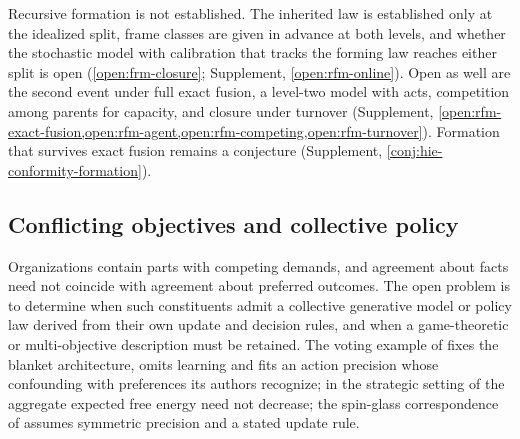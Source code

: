 Recursive formation is not established. The inherited law is established only at the idealized split, frame classes are given in advance at both levels, and whether the stochastic model with calibration that tracks the forming law reaches either split is open (\cref{open:frm-closure}; Supplement, \cref{open:rfm-online}). Open as well are the second event under full exact fusion, a level-two model with acts, competition among parents for capacity, and closure under turnover (Supplement, \cref{open:rfm-exact-fusion,open:rfm-agent,open:rfm-competing,open:rfm-turnover}). Formation that survives exact fusion remains a conjecture (Supplement, \cref{conj:hie-conformity-formation}).

\subsection{Conflicting objectives and collective policy}\label{sec:opn-4}

Organizations contain parts with competing demands, and agreement about facts need not coincide with agreement about preferred outcomes. The open problem is to determine when such constituents admit a collective generative model or policy law derived from their own update and decision rules, and when a game-theoretic or multi-objective description must be retained. The voting example of \citet{waade2025one} fixes the blanket architecture, omits learning and fits an action precision whose confounding with preferences its authors recognize; in the strategic setting of \citet{ruizserra2025factorised} the aggregate expected free energy need not decrease; the spin-glass correspondence of \citet{heins2023spin} assumes symmetric precision and a stated update rule.


